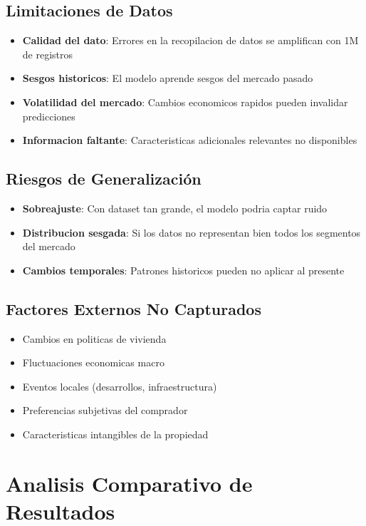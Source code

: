 \documentclass[12pt,a4paper]{article}
\begin{document}
\subsection{Limitaciones de Datos}
\begin{itemize}
    \item \textbf{Calidad del dato}: Errores en la recopilacion de datos se amplifican con 1M de registros
    \item \textbf{Sesgos historicos}: El modelo aprende sesgos del mercado pasado
    \item \textbf{Volatilidad del mercado}: Cambios economicos rapidos pueden invalidar predicciones
    \item \textbf{Informacion faltante}: Caracteristicas adicionales relevantes no disponibles
\end{itemize}

\subsection{Riesgos de Generalización}
\begin{itemize}
    \item \textbf{Sobreajuste}: Con dataset tan grande, el modelo podria captar ruido
    \item \textbf{Distribucion sesgada}: Si los datos no representan bien todos los segmentos del mercado
    \item \textbf{Cambios temporales}: Patrones historicos pueden no aplicar al presente
\end{itemize}

\subsection{Factores Externos No Capturados}
\begin{itemize}
    \item Cambios en politicas de vivienda
    \item Fluctuaciones economicas macro
    \item Eventos locales (desarrollos, infraestructura)
    \item Preferencias subjetivas del comprador
    \item Caracteristicas intangibles de la propiedad
\end{itemize}

\section{Analisis Comparativo de Resultados}
\end{document}

